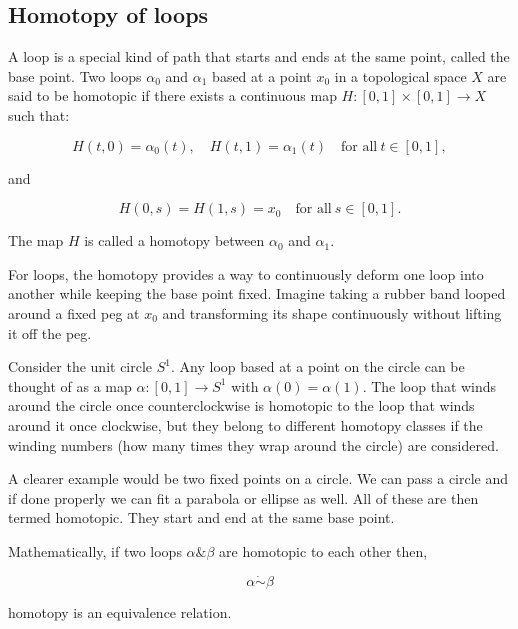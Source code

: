 \documentclass{article}
\begin{document}
\subsection{Homotopy of loops}

\begin{theorem}
A loop is a special kind of path that starts and ends at the same point, called the base point. Two loops \(\alpha_0\) and \(\alpha_1\) based at a point \(x_0\) in a topological space \(X\) are said to be homotopic if there exists a continuous map \(H: [0, 1] \times [0, 1] \to X\) such that:

\[
H(t, 0) = \alpha_0(t), \quad H(t, 1) = \alpha_1(t) \quad \text{for all} \ t \in [0, 1],
\]

and

\[
H(0, s) = H(1, s) = x_0 \quad \text{for all} \ s \in [0, 1].
\]

The map \(H\) is called a homotopy between \(\alpha_0\) and \(\alpha_1\).
\end{theorem}

For loops, the homotopy provides a way to continuously deform one loop into another while keeping the base point fixed. Imagine taking a rubber band looped around a fixed peg at \(x_0\) and transforming its shape continuously without lifting it off the peg.

Consider the unit circle \(S^1\). Any loop based at a point on the circle can be thought of as a map \(\alpha: [0, 1] \to S^1\) with \(\alpha(0) = \alpha(1)\). The loop that winds around the circle once counterclockwise is homotopic to the loop that winds around it once clockwise, but they belong to different homotopy classes if the winding numbers (how many times they wrap around the circle) are considered.

A clearer example would be two fixed points on a circle. We can pass a circle and if done properly we can fit a parabola or ellipse as well. All of these are then termed homotopic. 
They start and end at the same base point. 

Mathematically, if two loops \( \alpha \& \beta \) are homotopic to each other then, 

\[ \alpha \dot \sim \beta \]

homotopy is an equivalence relation. 
\end{document}
